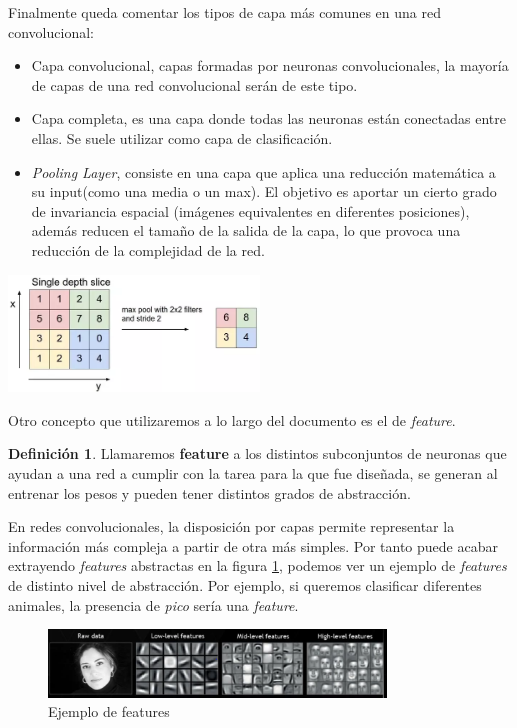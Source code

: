 \documentclass[12,twoside]{TFG-GM}
\theoremstyle{definition}
\newtheorem{definition}[theorem]{Definición}
\theoremstyle{remark}
\begin{document}
Finalmente queda comentar los tipos de capa más comunes en una red convolucional: 
\begin{itemize}
\item Capa convolucional, capas formadas por neuronas convolucionales, la mayoría de capas de una red convolucional serán de este tipo.
\item Capa completa, es una capa donde todas las neuronas están conectadas entre ellas. Se suele utilizar como capa de clasificación. 
\item \textit{Pooling Layer}, consiste en una capa que aplica una reducción matemática a su input(como una media o un max). El objetivo es aportar un cierto grado de invariancia espacial (imágenes equivalentes en diferentes posiciones), además reducen el tamaño de la salida de la capa, lo que provoca una reducción de la complejidad de la red.
\end{itemize}

\begin{center}
\includegraphics[width = 0.5\textwidth]{Images/pooling1.png} 
\end{center}

Otro concepto que utilizaremos a lo largo del documento es el de \textit{feature}.

\begin{definition}
Llamaremos \textbf{feature} a los distintos subconjuntos de neuronas que ayudan a una red a cumplir con la tarea para la que fue diseñada, se generan al entrenar los pesos y pueden tener distintos grados de abstracción. 
\end{definition}

En redes convolucionales, la disposición por capas permite representar la información más compleja a partir de otra más simples. Por tanto puede acabar extrayendo \textit{features} abstractas en la figura \ref{fig:deepconcept}, podemos ver un ejemplo de \textit{features} de distinto nivel de abstracción. Por ejemplo, si queremos clasificar diferentes animales, la presencia de \textit{pico} sería una \textit{feature}. 


\begin{figure}[h]
\centering
\includegraphics[width = 0.8\textwidth]{Images/deepConcept.png} 
\caption{Ejemplo de features \label{fig:deepconcept}}
\end{figure}
\end{document}
